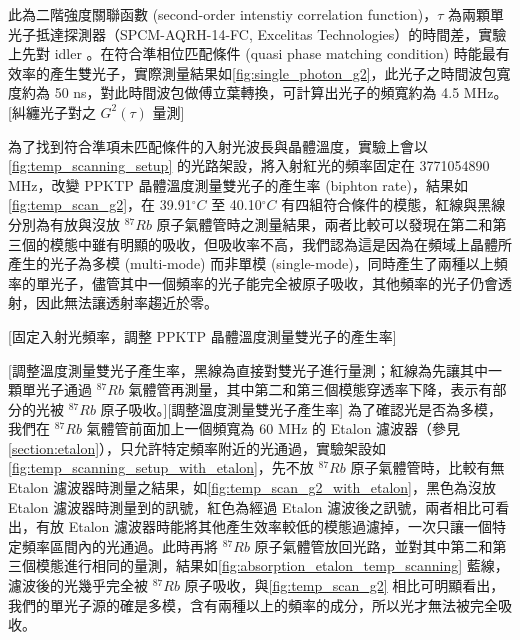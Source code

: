 \documentclass[class=NCU_thesis, crop=false]{standalone}
\begin{document}
此為二階強度關聯函數 (second-order intenstiy correlation function)，$\tau$ 為兩顆單光子抵達探測器（SPCM-AQRH-14-FC, Excelitas Technologies）的時間差，實驗上先對 idler 。在符合準相位匹配條件 (quasi phase matching condition) 時能最有效率的產生雙光子，實際測量結果如\cref{fig:single_photon_g2}，此光子之時間波包寬度約為 50 ns，對此時間波包做傅立葉轉換\cite{chuu2015narrowband}，可計算出光子的頻寬約為 4.5 MHz。
[糾纏光子對之 $G^{2}(\tau)$ 量測]


為了找到符合準項未匹配條件的入射光波長與晶體溫度，實驗上會以\cref{fig:temp_scanning_setup} 的光路架設，將入射紅光的頻率固定在 3771054890 MHz，改變 PPKTP 晶體溫度測量雙光子的產生率 (biphton rate)，結果如\cref{fig:temp_scan_g2}，在 39.91$^{\circ}C$ 至 40.10$^{\circ}C$ 有四組符合條件的模態，紅線與黑線分別為有放與沒放 $^{87}Rb$ 原子氣體管時之測量結果，兩者比較可以發現在第二和第三個的模態中雖有明顯的吸收，但吸收率不高，我們認為這是因為在頻域上晶體所產生的光子為多模 (multi-mode) 而非單模 (single-mode)，同時產生了兩種以上頻率的單光子，儘管其中一個頻率的光子能完全被原子吸收，其他頻率的光子仍會透射，因此無法讓透射率趨近於零。

[固定入射光頻率，調整 PPKTP 晶體溫度測量雙光子的產生率]

[調整溫度測量雙光子產生率，黑線為直接對雙光子進行量測；紅線為先讓其中一顆單光子通過 $^{87}Rb$ 氣體管再測量，其中第二和第三個模態穿透率下降，表示有部分的光被 $^{87}Rb$ 原子吸收。][調整溫度測量雙光子產生率]
為了確認光是否為多模，我們在 $^{87}Rb$ 氣體管前面加上一個頻寬為 60 MHz 的 Etalon 濾波器（參見\cref{section:etalon}），只允許特定頻率附近的光通過，實驗架設如 \cref{fig:temp_scanning_setup_with_etalon}，先不放 $^{87}Rb$ 原子氣體管時，比較有無 Etalon 濾波器時測量之結果，如\cref{fig:temp_scan_g2_with_etalon}，黑色為沒放 Etalon 濾波器時測量到的訊號，紅色為經過 Etalon 濾波後之訊號，兩者相比可看出，有放 Etalon 濾波器時能將其他產生效率較低的模態過濾掉，一次只讓一個特定頻率區間內的光通過。此時再將 $^{87}Rb$ 原子氣體管放回光路，並對其中第二和第三個模態進行相同的量測，結果如\cref{fig:absorption_etalon_temp_scanning} 藍線，濾波後的光幾乎完全被 $^{87}Rb$ 原子吸收，與\cref{fig:temp_scan_g2} 相比可明顯看出，我們的單光子源的確是多模，含有兩種以上的頻率的成分，所以光才無法被完全吸收。
\end{document}
